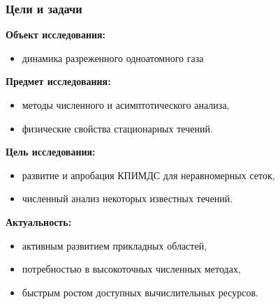 \documentclass[mathserif]{beamer} %
\title{\thesisTitle}
\author{%
    \emph{соискатель}:~\thesisAuthor\\ %
    \emph{руководитель}:~\supervisorRegaliaShort~\supervisorFio %
}
\institute{%
    \thesisOrganization %
}
\date{}
\begin{document}
\frame{\titlepage}

\begin{frame}
    \frametitle{Цели и задачи}
    \textbf{Объект исследования:}\vspace{-5pt}
    \begin{itemize}
        \item динамика разреженного одноатомного газа
    \end{itemize}
    \textbf{Предмет исследования:}\vspace{-5pt}
    \begin{itemize}
        \item методы численного и асимптотического анализа,
        \item физические свойства стационарных течений.
    \end{itemize}
    \textbf{Цель исследования:}\vspace{-5pt}
    \begin{itemize}
        \item развитие и апробация КПИМДС для неравномерных сеток,
        \item численный анализ некоторых известных течений.
    \end{itemize}
    \textbf{Актуальность:}\vspace{-5pt}
    \begin{itemize}
        \item активным развитием прикладных областей,
        \item потребностью в высокоточных численных методах,
        \item быстрым ростом доступных вычислительных ресурсов.
    \end{itemize}
\end{frame}
\end{document}
